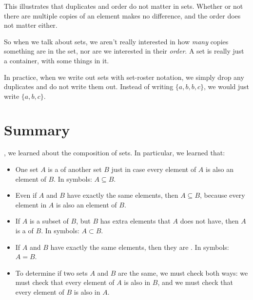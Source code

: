 \documentclass[../../../main.tex]{subfiles}
\begin{document}
This illustrates that duplicates and order do not matter in sets. Whether or not there are multiple copies of an element makes no difference, and the order does not matter either. 

So when we talk about sets, we aren't really interested in how \emph{many} copies something are in the set, nor are we interested in their \emph{order}. A set is really just a container, with some things in it.

In practice, when we write out sets with set-roster notation, we simply drop any duplicates and do not write them out. Instead of writing $\{ a, b, b, c \}$, we would just write $\{ a, b, c \}$.


\section{Summary}

, we learned about the composition of sets. In particular, we learned that:

\begin{itemize}

  \item One set $A$ is a  of another set $B$ just in case every element of $A$ is also an element of $B$. In symbols: $A \subseteq B$.
  
  \item Even if $A$ and $B$ have exactly the same elements, then $A \subseteq B$, because every element in $A$ is also an element of $B$. 
  
  \item If $A$ is a subset of $B$, but $B$ has extra elements that $A$ does not have, then $A$ is a  of $B$. In symbols: $A \subset B$.
  
  \item If $A$ and $B$ have exactly the same elements, then they are . In symbols: $A = B$. 
  
  \item To determine if two sets $A$ and $B$ are the same, we must check both ways: we must check that every element of $A$ is also in $B$, and we must check that every element of $B$ is also in $A$.

\end{itemize}
\end{document}

